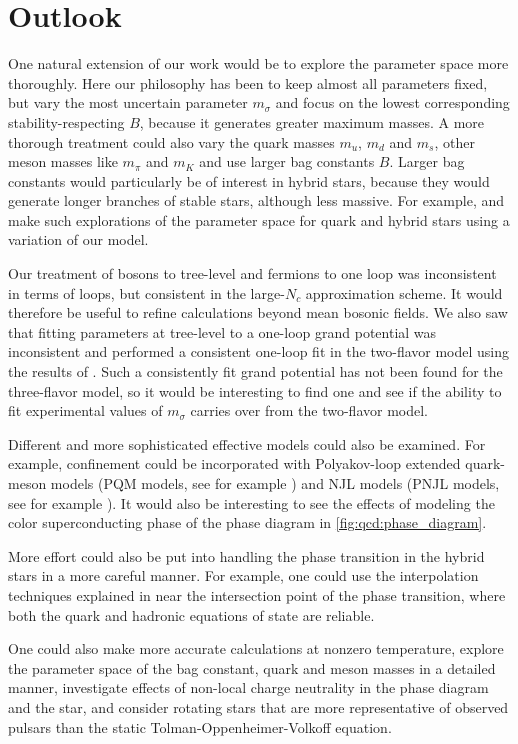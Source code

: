 \section{Outlook}

One natural extension of our work would be to
explore the parameter space more thoroughly.
Here our philosophy has been to keep almost all parameters fixed,
but vary the most uncertain parameter $m_\sigma$ and focus on the lowest corresponding stability-respecting $B$,
because it generates greater maximum masses.
A more thorough treatment could also vary the quark masses $m_u$, $m_d$ and $m_s$,
other meson masses like $m_\pi$ and $m_K$ and use larger bag constants $B$.
Larger bag constants would particularly be of interest in hybrid stars,
because they would generate longer branches of stable stars, although less massive.
For example, \cite{ref:lsm3f_compact_stars} and \cite{ref:lsm3f_hybrid_stars}
make such explorations of the parameter space for quark and hybrid stars
using a variation of our model.

Our treatment of bosons to tree-level and fermions to one loop was inconsistent in terms of loops,
but consistent in the large-$N_c$ approximation scheme.
It would therefore be useful to refine calculations beyond mean bosonic fields.
We also saw that fitting parameters at tree-level to a one-loop grand potential was inconsistent
and performed a consistent one-loop fit in the two-flavor model using the results of \cite{ref:jo_lsm_consistent_chiral,ref:jo_lsm_consistent_physical}.
Such a consistently fit grand potential has not been found for the three-flavor model,
so it would be interesting to find one and see if the ability to fit experimental values of $m_\sigma$ carries over from the two-flavor model.

Different and more sophisticated effective models could also be examined.
For example, confinement could be incorporated with Polyakov-loop extended quark-meson models (PQM models, see for example \cite{ref:pqm_2f,ref:pqm_3f,ref:master_folkestad}) and NJL models (PNJL models, see for example \cite{ref:pnjl_2f,ref:pnjl_3f,ref:pnjl_3f_zeroT}).
It would also be interesting to see the effects of modeling the color superconducting phase of the phase diagram in \cref{fig:qcd:phase_diagram}.

More effort could also be put into handling the phase transition in the hybrid stars in a more careful manner.
For example, one could use the interpolation techniques explained in \cite{ref:quark_star_review}
near the intersection point of the phase transition,
where both the quark and hadronic equations of state are reliable.

One could also make more accurate calculations at nonzero temperature,
explore the parameter space of the bag constant, quark and meson masses in a detailed manner,
investigate effects of non-local charge neutrality in the phase diagram and the star,
and consider rotating stars that are more representative of observed pulsars than the static Tolman-Oppenheimer-Volkoff equation.
